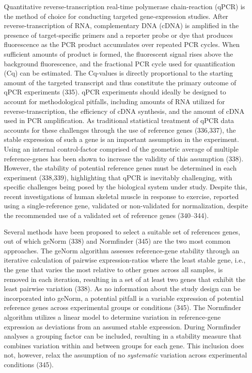 \documentclass[twoside,10pt]{gihclass} %
\begin{document}
Quantitative reverse-transcription real-time polymerase chain-reaction (qPCR) is the method of choice for conducting targeted gene-expression studies.
After reverse-transcription of RNA, complementary DNA (cDNA) is amplified in the presence of target-specific primers and a reporter probe or dye that produces fluorescence as the PCR product accumulates over repeated PCR cycles. When sufficient amounts of product is formed, the fluorescent signal rises above the background fluorescence, and the fractional PCR cycle used for quantification (Cq) can be estimated. The Cq-values is directly proportional to the starting amount of the targeted transcript and thus constitute the primary outcome of qPCR experiments
(335).
qPCR experiments should ideally be designed to account for methodological pitfalls, including amounts of RNA utilized for reverse-transcription, the efficiency of cDNA synthesis, and the amount of cDNA used in PCR amplification.
As traditional statistical treatment of qPCR data accounts for these challenges through the use of reference genes (336,337), the stable expression of such a gene is an important assumption in the experiment.
Using an internal control-factor comprised of the geometric average of multiple reference-genes has been shown to increase the validity of this assumption (338).
However, the stability of potential reference genes must be determined in each experiment (338,339), highlighting that qPCR is inevitably challenging, with specific challenges being posed by the biological system under study.
Despite this, recent investigations of human skeletal muscle in response to exercise, reported using a single-reference gene, validated or non-validated for normalization, despite the recommended use of a validated set of reference genes (340--344).

Several methods have been proposed to select a suitable set of references genes, out of which geNorm (338) and Normfinder (345) are the two most common approaches.
The geNorm algorithm assesses reference-gene stability through an iterative calculation of pairwise expression-ratios where the least stable gene, i.e., the gene that varies the most relative to other genes across all samples, is removed in each iteration, resulting in a set of at least two genes that exhibit the least pairwise variation (338).
As no information about the study design can be incorporated into geNorm, a potential pitfall is a variable expression of potential reference genes across experimental groups or conditions (345).
The Normfinder algorithm utilizes a linear model to determine variation in reference-gene expression as deviations from an assumed stable expression.
During Normfinder analyses a grouping factor can be included, resulting in a stability measure that combines variation within and between groups for each gene.
This inclusion does not, however, relax the assumption of no \emph{systematic} variation across experimental conditions (345).
\end{document}
